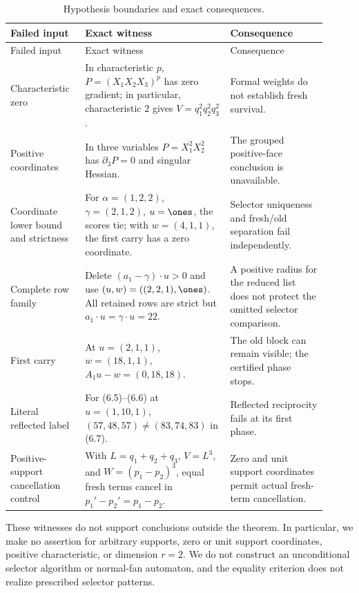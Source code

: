 \documentclass[11pt]{article}
\theoremstyle{definition}
\theoremstyle{remark}
\begin{document}
\begin{longtable}{@{}p{0.20\linewidth}p{0.42\linewidth}p{0.29\linewidth}@{}}
\caption{Hypothesis boundaries and exact consequences.}
\label{tab:boundaries}\\
\toprule
Failed input & Exact witness & Consequence\\
\midrule
\endfirsthead
\toprule
Failed input & Exact witness & Consequence\\
\midrule
\endhead
Characteristic zero &
In characteristic \(p\),
\(P=(X_1X_2X_3)^p\) has zero gradient; in particular, characteristic
\(2\) gives \(V=q_1^2q_2^2q_3^2\). &
Formal weights do not establish fresh survival.\\
\addlinespace
Positive coordinates &
In three variables \(P=X_1^2X_2^2\) has
\(\partial_3P=0\) and singular Hessian. &
The grouped positive-face conclusion is unavailable.\\
\addlinespace
Coordinate lower bound and strictness &
For \(\alpha=(1,2,2)\), \(\gamma=(2,1,2)\), \(u=\ones\), the scores tie;
with \(w=(4,1,1)\), the first carry has a zero coordinate. &
Selector uniqueness and fresh/old separation fail independently.\\
\addlinespace
Complete row family &
Delete \((a_1-\gamma)\cdot u>0\) and use
\((u,w)=((2,2,1),\ones)\).  All retained rows are strict but
\(a_1\cdot u=\gamma\cdot u=22\). &
A positive radius for the reduced list does not protect the omitted
selector comparison.\\
\addlinespace
First carry &
At \(u=(2,1,1)\), \(w=(18,1,1)\),
\(A_1u-w=(0,18,18)\). &
The old block can remain visible; the certified phase stops.\\
\addlinespace
Literal reflected label &
For (6.5)--(6.6) at \(u=(1,10,1)\),
\((57,48,57)\neq(83,74,83)\) in (6.7). &
Reflected reciprocity fails at its first phase.\\
\addlinespace
Positive-support cancellation control &
With \(L=q_1+q_2+q_3\), \(V=L^3\), and
\(W=(p_1-p_2)^3\), equal fresh terms cancel in
\(p_1'-p_2'=p_1-p_2\). &
Zero and unit support coordinates permit actual fresh-term cancellation.\\
\bottomrule
\end{longtable}

These witnesses do not support conclusions outside the theorem.  In
particular, we make no assertion for arbitrary supports, zero or unit
support coordinates, positive characteristic, or dimension \(r=2\).  We
do not construct an unconditional selector algorithm or normal-fan
automaton, and the equality criterion does not realize prescribed
selector patterns.
\end{document}
